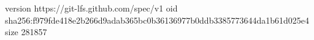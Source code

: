 version https://git-lfs.github.com/spec/v1
oid sha256:f979fde418e2b266d9adab365bc0b36136977b0ddb3385773644da1b61d025e4
size 281857
